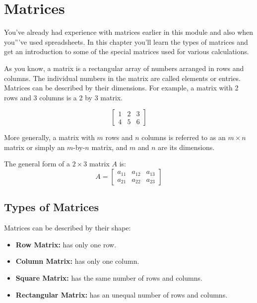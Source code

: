 \chapter{Matrices}
You've already had experience with matrices earlier in this module and also when you'''ve used spreadsheets. In this chapter you'll learn the types of matrices and get an introduction to some of the special matrices used for various calculations. 

As you know, a matrix is a rectangular array of numbers arranged in rows and columns. The individual numbers in the matrix are called elements or entries. Matrices can be described by their dimensions. For example, a matrix with 2 rows and 3 columns is a 2 by 3 matrix.

$$\begin{bmatrix}
1 &2  &3\\
 4 &5  &6 
\end{bmatrix}
$$

More generally, a matrix with $m$ rows and $n$ columns is referred to as an $m \times n$ matrix or simply an $m$-by-$n$ matrix, and $m$ and $n$ are its dimensions.

The general form of a $2 \times 3$ matrix $A$ is:
$$
A = \begin{bmatrix}
a_{11} & a_{12} & a_{13} \\
a_{21} & a_{22} & a_{23}
\end{bmatrix}
$$

\section{Types of Matrices}
Matrices can be described by their shape:
\begin{itemize}
	\item \textbf{Row Matrix:} has only one row.
	\item \textbf{Column Matrix:} has only one column.
	\item \textbf{Square Matrix:} has the same number of rows and columns.
	\item \textbf{Rectangular Matrix:} has an unequal number of rows and columns.
\end{itemize}

